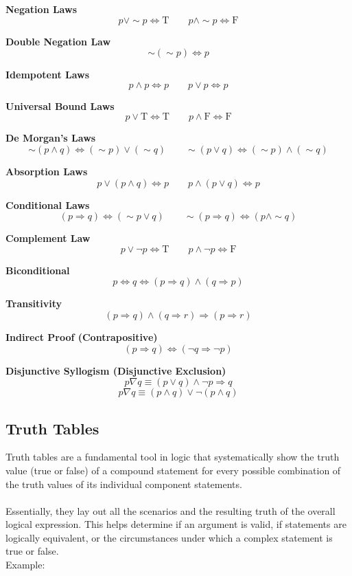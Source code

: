 \textbf{Negation Laws}
\[
p \lor \sim p \Leftrightarrow \text{T} \qquad p \land \sim p \Leftrightarrow \text{F}
\]

\textbf{Double Negation Law}
\[
\sim(\sim p) \Leftrightarrow p
\]

\textbf{Idempotent Laws}
\[
p \land p \Leftrightarrow p \qquad p \lor p \Leftrightarrow p
\]

\textbf{Universal Bound Laws}
\[
p \lor \text{T} \Leftrightarrow \text{T} \qquad p \land \text{F} \Leftrightarrow \text{F}
\]

\textbf{De Morgan’s Laws}
\[
\sim (p \land q) \Leftrightarrow (\sim p) \lor (\sim q) \qquad
\sim (p \lor q) \Leftrightarrow (\sim p) \land (\sim q)
\]

\textbf{Absorption Laws}
\[
p \lor (p \land q) \Leftrightarrow p \qquad p \land (p \lor q) \Leftrightarrow p
\]

\textbf{Conditional Laws}
\[
(p \Rightarrow q) \Leftrightarrow (\sim p \lor q) \qquad \sim(p \Rightarrow q) \Leftrightarrow (p \land \sim q)
\]

\textbf{Complement Law}
\[
p \lor \neg p \Leftrightarrow \text{T} \qquad p \land \neg p \Leftrightarrow \text{F}
\]

\textbf{Biconditional}
\[
p \Leftrightarrow q \Leftrightarrow (p \Rightarrow q) \land (q \Rightarrow p)
\]

\textbf{Transitivity}
\[
(p \Rightarrow q) \land (q \Rightarrow r) \Rightarrow (p \Rightarrow r)
\]

\textbf{Indirect Proof (Contrapositive)}
\[
(p \Rightarrow q) \Leftrightarrow (\neg q \Rightarrow \neg p)
\]

\textbf{Disjunctive Syllogism (Disjunctive Exclusion)}
\[
   p \nabla q \equiv (p \lor q) \land \neg p \Rightarrow q
\]
\[
  p \nabla q \equiv(p \land q) \lor \neg  (p \land q)
\]

\subsection{Truth Tables}
\smallskip
Truth tables are a fundamental tool in logic that systematically show the truth value (true or false) of a compound statement for every possible combination of the truth values of its individual component statements.\\\\
Essentially, they lay out all the scenarios and the resulting truth of the overall logical expression. This helps determine if an argument is valid, if statements are logically equivalent, or the circumstances under which a complex statement is true or false.\\
Example:
\smallskip

